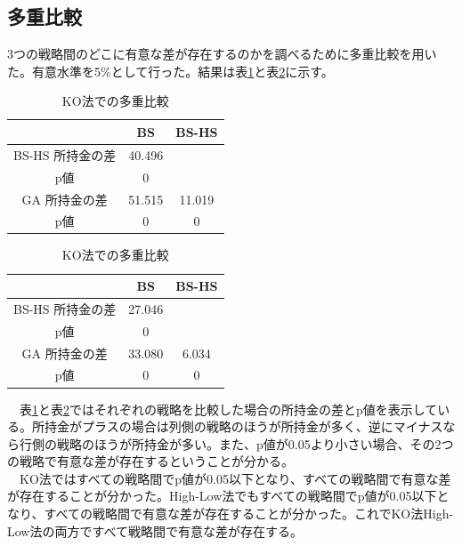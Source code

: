 \subsection{多重比較}
3つの戦略間のどこに有意な差が存在するのかを調べるために多重比較を用いた。有意水準を5\%として行った。結果は表\ref{multiKO}と表\ref{multiHigh-Low}に示す。
\begin{table}[H]
 \caption{KO法での多重比較\label{multiKO}}
 \begin{center}
  \begin{tabular}{|c|c|c|}
  \hline  & BS & BS-HS  \\
  \hline  BS-HS 所持金の差 & 40.496 & \\
	               p値 & 0 & \\
  \hline GA 所持金の差　& 51.515 & 11.019\\
                p値 & 0 & 0\\
  \hline
  \end{tabular}
 \end{center}
\end{table}
\begin{table}[H]
 \caption{KO法での多重比較\label{multiHigh-Low}}
 \begin{center}
  \begin{tabular}{|c|c|c|}
  \hline  & BS & BS-HS  \\
  \hline  BS-HS 所持金の差 & 27.046 & \\
	               p値 & 0 & \\
  \hline GA 所持金の差　& 33.080 & 6.034\\
                p値 & 0 & 0\\
  \hline
  \end{tabular}
 \end{center}
\end{table}
　表\ref{multiKO}と表\ref{multiHigh-Low}ではそれぞれの戦略を比較した場合の所持金の差とp値を表示している。所持金がプラスの場合は列側の戦略のほうが所持金が多く、逆にマイナスなら行側の戦略のほうが所持金が多い。また、p値が0.05より小さい場合、その2つの戦略で有意な差が存在するということが分かる。\\
　KO法ではすべての戦略間でp値が0.05以下となり、すべての戦略間で有意な差が存在することが分かった。High-Low法でもすべての戦略間でp値が0.05以下となり、すべての戦略間で有意な差が存在することが分かった。これでKO法High-Low法の両方ですべて戦略間で有意な差が存在する。
